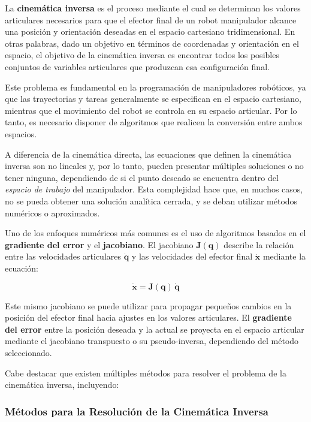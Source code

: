 La \textbf{cinemática inversa} es el proceso mediante el cual se determinan los valores articulares necesarios para que el efector final de un robot manipulador alcance una posición y orientación deseadas en el espacio cartesiano tridimensional. En otras palabras, dado un objetivo en términos de coordenadas y orientación en el espacio, el objetivo de la cinemática inversa es encontrar todos los posibles conjuntos de variables articulares que produzcan esa configuración final.

Este problema es fundamental en la programación de manipuladores robóticos, ya que las trayectorias y tareas generalmente se especifican en el espacio cartesiano, mientras que el movimiento del robot se controla en su espacio articular. Por lo tanto, es necesario disponer de algoritmos que realicen la conversión entre ambos espacios.

A diferencia de la cinemática directa, las ecuaciones que definen la cinemática inversa son no lineales y, por lo tanto, pueden presentar múltiples soluciones o no tener ninguna, dependiendo de si el punto deseado se encuentra dentro del \textit{espacio de trabajo} del manipulador. Esta complejidad hace que, en muchos casos, no se pueda obtener una solución analítica cerrada, y se deban utilizar métodos numéricos o aproximados.

Uno de los enfoques numéricos más comunes es el uso de algoritmos basados en el \textbf{gradiente del error} y el \textbf{jacobiano}. El jacobiano $\mathbf{J}(\mathbf{q})$ describe la relación entre las velocidades articulares $\dot{\mathbf{q}}$ y las velocidades del efector final $\dot{\mathbf{x}}$ mediante la ecuación:

\[
\dot{\mathbf{x}} = \mathbf{J}(\mathbf{q}) \, \dot{\mathbf{q}}
\]

Este mismo jacobiano se puede utilizar para propagar pequeños cambios en la posición del efector final hacia ajustes en los valores articulares. El \textbf{gradiente del error} entre la posición deseada y la actual se proyecta en el espacio articular mediante el jacobiano transpuesto o su pseudo-inversa, dependiendo del método seleccionado.

Cabe destacar que existen múltiples métodos para resolver el problema de la cinemática inversa, incluyendo:
\subsubsection{Métodos para la Resolución de la Cinemática Inversa}

